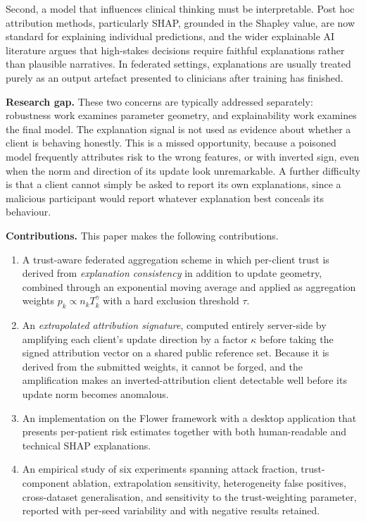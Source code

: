 \documentclass[10pt,twocolumn,letterpaper]{article}
\begin{document}
Second, a model that influences clinical thinking must be interpretable. Post
hoc attribution methods, particularly SHAP, grounded
in the Shapley value, are now standard for explaining
individual predictions, and the wider explainable AI literature argues that
high-stakes decisions require faithful explanations rather than plausible
narratives. In federated
settings, explanations are usually treated purely as an output artefact
presented to clinicians after training has finished.

\textbf{Research gap.} These two concerns are typically addressed
separately: robustness work examines parameter geometry, and explainability
work examines the final model. The explanation signal is not used as evidence
about whether a client is behaving honestly. This is a missed opportunity,
because a poisoned model frequently attributes risk to the wrong features, or
with inverted sign, even when the norm and direction of its update look
unremarkable. A further difficulty is that a client cannot simply be asked to
report its own explanations, since a malicious participant would report
whatever explanation best conceals its behaviour.

\textbf{Contributions.} This paper makes the following contributions.
\begin{enumerate}
 \item A trust-aware federated aggregation scheme in which per-client trust
 is derived from \emph{explanation consistency} in addition to update
 geometry, combined through an exponential moving average and applied
 as aggregation weights $p_k \propto n_k T_k^{\gamma}$ with a hard
 exclusion threshold $\tau$.
 \item An \emph{extrapolated attribution signature}, computed entirely
 server-side by amplifying each client's update direction by a factor
 $\kappa$ before taking the signed attribution vector on a shared
 public reference set. Because it is derived from the submitted
 weights, it cannot be forged, and the amplification makes an
 inverted-attribution client detectable well before its update norm
 becomes anomalous.
 \item An implementation on the Flower framework
 with a desktop application that presents
 per-patient risk estimates together with both human-readable and
 technical SHAP explanations.
 \item An empirical study of six experiments spanning attack fraction,
 trust-component ablation, extrapolation sensitivity, heterogeneity
 false positives, cross-dataset generalisation, and sensitivity to
 the trust-weighting parameter, reported with per-seed variability
 and with negative results retained.
\end{enumerate}
\end{document}
